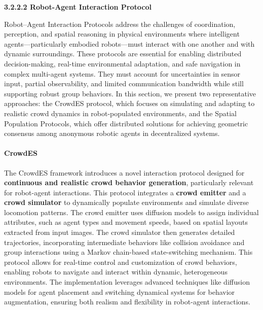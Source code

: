 \documentclass[10pt,preprint]{article}
\begin{document}
\vspace{1ex}
\noindent\textbf{3.2.2.2 Robot-Agent Interaction Protocol}
\vspace{1ex}

Robot–Agent Interaction Protocols address the challenges of coordination, perception, and spatial reasoning in physical environments where intelligent agents—particularly embodied robots—must interact with one another and with dynamic surroundings. These protocols are essential for enabling distributed decision-making, real-time environmental adaptation, and safe navigation in complex multi-agent systems. They must account for uncertainties in sensor input, partial observability, and limited communication bandwidth while still supporting robust group behaviors. In this section, we present two representative approaches: the CrowdES protocol, which focuses on simulating and adapting to realistic crowd dynamics in robot-populated environments, and the Spatial Population Protocols, which offer distributed solutions for achieving geometric consensus among anonymous robotic agents in decentralized systems.

\paragraph{CrowdES~\citep{bae2025continuouslocomotivecrowdbehavior}} The CrowdES framework introduces a novel interaction protocol designed for \textbf{continuous and realistic crowd behavior generation}, particularly relevant for robot-agent interactions. This protocol integrates a \textbf{crowd emitter} and a \textbf{crowd simulator} to dynamically populate environments and simulate diverse locomotion patterns. The crowd emitter uses diffusion models to assign individual attributes, such as agent types and movement speeds, based on spatial layouts extracted from input images. The crowd simulator then generates detailed trajectories, incorporating intermediate behaviors like collision avoidance and group interactions using a Markov chain-based state-switching mechanism. This protocol allows for real-time control and customization of crowd behaviors, enabling robots to navigate and interact within dynamic, heterogeneous environments. The implementation leverages advanced techniques like diffusion models for agent placement and switching dynamical systems for behavior augmentation, ensuring both realism and flexibility in robot-agent interactions.
\end{document}
